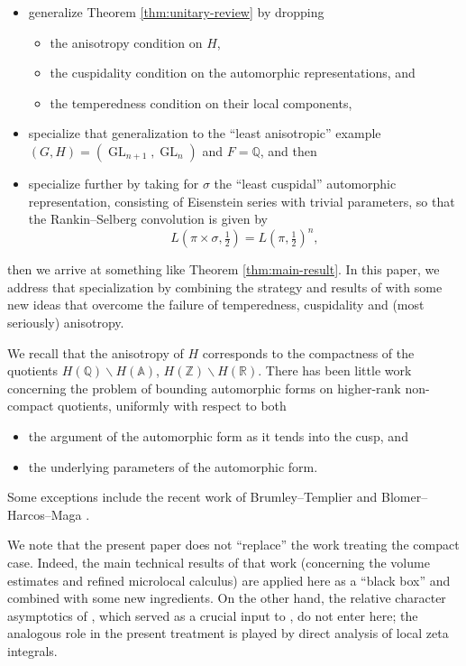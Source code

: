 \documentclass[reqno]{amsart}
\DeclareMathOperator{\GL}{GL}
\theoremstyle{plain} \newtheorem{theorem} {Theorem}
\theoremstyle{definition} \newtheorem{definition} [theorem] {Definition}
\theoremstyle{itplain} %
\numberwithin{equation}{section}
\numberwithin{theorem}{section}
\begin{document}
\begin{itemize}
\item generalize Theorem \ref{thm:unitary-review} by dropping
  \begin{itemize}
  \item the anisotropy condition on $H$,
  \item the cuspidality condition on the automorphic representations, and
  \item the temperedness condition on their local components,
  \end{itemize}
\item specialize that generalization to the ``least anisotropic'' example $(G,H) = (\GL_{n+1}, \GL_n)$ and $F = \mathbb{Q}$, and then
\item specialize further by taking for $\sigma$ the ``least cuspidal'' automorphic representation, consisting of Eisenstein series with trivial parameters, so that the Rankin--Selberg convolution is given by
  \begin{equation*}
    L(\pi \times \sigma, \tfrac{1}{2}) = L(\pi, \tfrac{1}{2})^n, 
  \end{equation*}
\end{itemize}
then we arrive at something like Theorem \ref{thm:main-result}.  In this paper, we address that specialization by combining the strategy and results of \cite{2020arXiv201202187N} with some new ideas that overcome the failure of temperedness, cuspidality and (most seriously) anisotropy.

We recall that the anisotropy of $H$ corresponds to the compactness of the quotients $H(\mathbb{Q}) \backslash H(\mathbb{A})$, $H(\mathbb{Z}) \backslash H(\mathbb{R})$.  There has been little work concerning the problem of bounding automorphic forms on higher-rank non-compact quotients, uniformly with respect to both
\begin{itemize}
\item the argument of the automorphic form as it tends into the cusp, and
\item the underlying parameters of the automorphic form.
\end{itemize}
Some exceptions include the recent work of Brumley--Templier \cite{MR4150475} and Blomer--Harcos--Maga \cite{MR3905609, MR4093914}.

We note that the present paper does not ``replace'' the work \cite{2020arXiv201202187N} treating the compact case.  Indeed, the main technical results of that work (concerning the volume estimates and refined microlocal calculus) are applied here as a ``black box'' and combined with some new ingredients.  On the other hand, the relative character asymptotics of \cite[\S19]{nelson-venkatesh-1}, which served as a crucial input to \cite{2020arXiv201202187N}, do not enter here; the analogous role in the present treatment is played by direct analysis of local zeta integrals.
\end{document}
